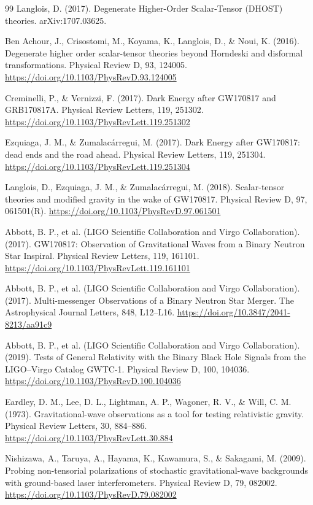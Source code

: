 \documentclass[12pt,a4paper]{article}
\begin{document}
\begin{thebibliography}{99}
		Langlois, D. (2017). Degenerate Higher-Order Scalar-Tensor (DHOST) theories. arXiv:1707.03625.
		
		Ben Achour, J., Crisostomi, M., Koyama, K., Langlois, D., \& Noui, K. (2016). Degenerate higher order scalar-tensor theories beyond Horndeski and disformal transformations. Physical Review D, 93, 124005. \url{https://doi.org/10.1103/PhysRevD.93.124005}
		
		Creminelli, P., \& Vernizzi, F. (2017). Dark Energy after GW170817 and GRB170817A. Physical Review Letters, 119, 251302. \url{https://doi.org/10.1103/PhysRevLett.119.251302}
		
		Ezquiaga, J. M., \& Zumalacárregui, M. (2017). Dark Energy after GW170817: dead ends and the road ahead. Physical Review Letters, 119, 251304. \url{https://doi.org/10.1103/PhysRevLett.119.251304}
		
		Langlois, D., Ezquiaga, J. M., \& Zumalacárregui, M. (2018). Scalar-tensor theories and modified gravity in the wake of GW170817. Physical Review D, 97, 061501(R). \url{https://doi.org/10.1103/PhysRevD.97.061501}
		
		Abbott, B. P., et al. (LIGO Scientific Collaboration and Virgo Collaboration). (2017). GW170817: Observation of Gravitational Waves from a Binary Neutron Star Inspiral. Physical Review Letters, 119, 161101. \url{https://doi.org/10.1103/PhysRevLett.119.161101}
		
		Abbott, B. P., et al. (LIGO Scientific Collaboration and Virgo Collaboration). (2017). Multi-messenger Observations of a Binary Neutron Star Merger. The Astrophysical Journal Letters, 848, L12–L16. \url{https://doi.org/10.3847/2041-8213/aa91c9}
		
		Abbott, B. P., et al. (LIGO Scientific Collaboration and Virgo Collaboration). (2019). Tests of General Relativity with the Binary Black Hole Signals from the LIGO–Virgo Catalog GWTC-1. Physical Review D, 100, 104036. \url{https://doi.org/10.1103/PhysRevD.100.104036}
		
		Eardley, D. M., Lee, D. L., Lightman, A. P., Wagoner, R. V., \& Will, C. M. (1973). Gravitational-wave observations as a tool for testing relativistic gravity. Physical Review Letters, 30, 884–886. \url{https://doi.org/10.1103/PhysRevLett.30.884}
		
		Nishizawa, A., Taruya, A., Hayama, K., Kawamura, S., \& Sakagami, M. (2009). Probing non-tensorial polarizations of stochastic gravitational-wave backgrounds with ground-based laser interferometers. Physical Review D, 79, 082002. \url{https://doi.org/10.1103/PhysRevD.79.082002}
		

\end{thebibliography}
\end{document}
